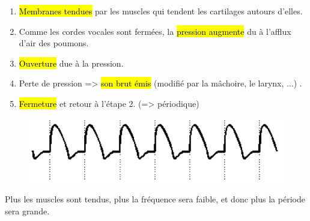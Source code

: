 \documentclass[letterpaper, 12pt]{article}
\begin{document}
			\begin{minipage}{0.4\textwidth}
				\begin{enumerate}
					\setlength{\itemsep}{0pt}		
					\setlength{\parskip}{0pt}		
					\setlength{\parsep}{0pt}	
					\item \hl{Membranes tendues} par les muscles qui tendent les cartilages autours d'elles.  
					\item Comme les cordes vocales sont fermées, la \hl{pression augmente} du à l'afflux d'air
						des poumons.
					\item \hl{Ouverture} due à la pression.
					\item Perte de pression => \hl{son brut \'emis} (modifié par la mâchoire, le larynx, ...) .
					\item \hl{Fermeture} et retour à l'étape 2. (=> périodique)
				\end{enumerate}
			\end{minipage}
			\begin{figure}[H]
				\centering
				\includegraphics[scale=0.5]{Images/vocal_cords2}
			\end{figure}\noindent
			Plus les muscles sont tendus, plus la fréquence sera faible, et donc plus la période sera grande.
		
\end{document}
